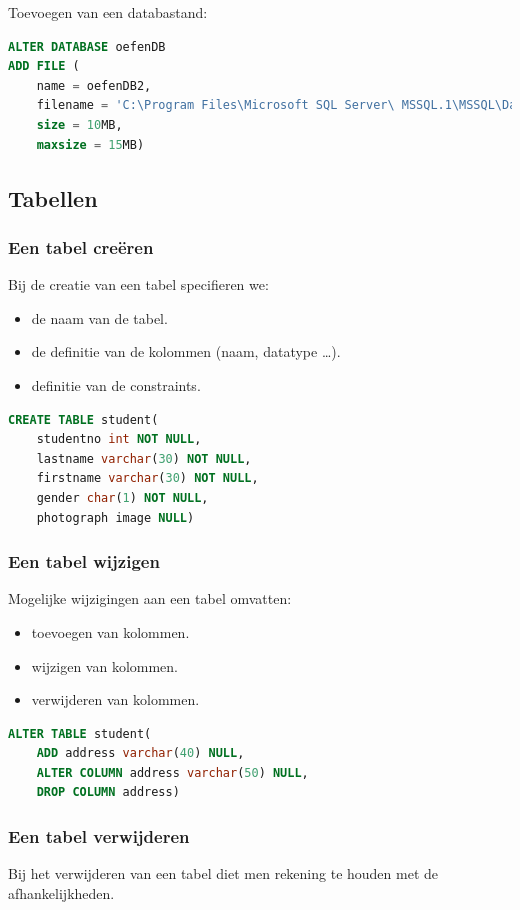 \documentclass[a4paper,12pt]{article}
\begin{document}
Toevoegen van een databastand:
\begin{lstlisting}[language=sql, breaklines=true]
ALTER DATABASE oefenDB
ADD FILE (
	name = oefenDB2,
	filename = 'C:\Program Files\Microsoft SQL Server\ MSSQL.1\MSSQL\Data\oefenDB2.ndf',
	size = 10MB,
	maxsize = 15MB)
\end{lstlisting}

\subsection{Tabellen}
\subsubsection{Een tabel creëren}
Bij de creatie van een tabel specifieren we:
\begin{itemize}
\item de naam van de tabel.
\item de definitie van de kolommen (naam, datatype \dots).
\item definitie van de constraints.
\end{itemize}

\begin{lstlisting}[language=sql, breaklines=true]
CREATE TABLE student(
	studentno int NOT NULL,
	lastname varchar(30) NOT NULL,
	firstname varchar(30) NOT NULL,
	gender char(1) NOT NULL,
	photograph image NULL)
\end{lstlisting}

\subsubsection{Een tabel wijzigen}
Mogelijke wijzigingen aan een tabel omvatten:
\begin{itemize}
\item toevoegen van kolommen.
\item wijzigen van kolommen.
\item verwijderen van kolommen.
\end{itemize}

\begin{lstlisting}[language=sql, breaklines=true]
ALTER TABLE student(
	ADD address varchar(40) NULL,
	ALTER COLUMN address varchar(50) NULL,
	DROP COLUMN address)
\end{lstlisting}

\subsubsection{Een tabel verwijderen}
Bij het verwijderen van een tabel diet men rekening te houden met de afhankelijkheden.
\end{document}
